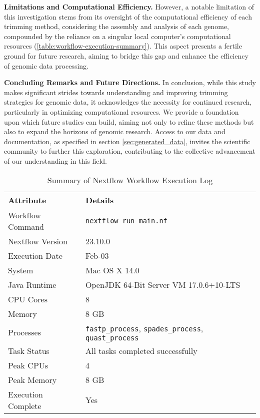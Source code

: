 \textbf{Limitations and Computational Efficiency.} However, a notable limitation of this investigation stems from its oversight of the computational efficiency of each trimming method, considering the assembly and analysis of each genome, compounded by the reliance on a singular local computer's computational resources (\autoref{table:workflow-execution-summary}). This aspect presents a fertile ground for future research, aiming to bridge this gap and enhance the efficiency of genomic data processing.

\textbf{Concluding Remarks and Future Directions.} In conclusion, while this study makes significant strides towards understanding and improving trimming strategies for genomic data, it acknowledges the necessity for continued research, particularly in optimizing computational resources. We provide a foundation upon which future studies can build, aiming not only to refine these methods but also to expand the horizons of genomic research. Access to our data and documentation, as specified in section \ref{sec:generated_data}, invites the scientific community to further this exploration, contributing to the collective advancement of our understanding in this field.


\begin{table}[h]
\centering
\caption{Summary of Nextflow Workflow Execution Log}
\label{table:workflow-execution-summary}
\begin{tabular}{ll}
\hline
\textbf{Attribute} & \textbf{Details} \\
\hline
Workflow Command & \texttt{nextflow run main.nf} \\
Nextflow Version & 23.10.0 \\
Execution Date & Feb-03 \\
System & Mac OS X 14.0 \\
Java Runtime & OpenJDK 64-Bit Server VM 17.0.6+10-LTS \\
CPU Cores & 8 \\
Memory & 8 GB \\
Processes & \texttt{fastp\_process}, \texttt{spades\_process}, \texttt{quast\_process} \\
Task Status & All tasks completed successfully \\
Peak CPUs & 4 \\
Peak Memory & 8 GB \\
Execution Complete & Yes \\
\hline
\end{tabular}
\end{table}
